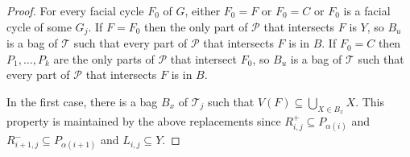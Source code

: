 \documentclass{patmorin}
\theoremstyle{plain}
\theoremstyle{definition}
\newcommand{\PP}{\mathcal{P}}
\renewcommand{\leq}{\leqslant}
\begin{document}
\begin{proof}
For every facial cycle $F_0$ of $G$, either $F_0=F$ or $F_0=C$ or $F_0$ is a facial cycle of some $G_j$. If $F=F_0$ then the only part of $\PP$ that intersects $F$ is $Y$, so $B_u$ is a bag of $\mathcal{T}$ such that every part of $\PP$ that intersects $F$ is in $B$. If $F_0=C$ then $P_1,\dots,P_k$ are the only parts of $\PP$ that intersect $F_0$, so $B_u$ is a bag of $\mathcal{T}$ such that every part of $\PP$ that intersects $F$ is in $B$.

In the first case, there is a bag $B_x$ of $\mathcal{T}_j$ such that $V(F)\subseteq \bigcup_{X\in B_x} X$. This property is maintained by the above replacements since
$R_{i,j}^+ \subseteq P_{\alpha(i)}$ and
$R_{i+1,j}^- \subseteq P_{\alpha(i+1)}$ and
$L_{i,j}\subseteq Y$.






\end{proof}
\end{document}
